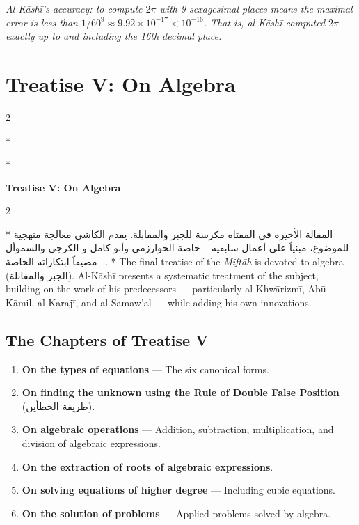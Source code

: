 \documentclass[11pt,a4paper]{article}
\newcommand{\cnote}[1]{\textcolor{notecolor}{\textit{#1}}}
\newcommand{\ar}[1]{{\arabicfont\beginR #1\endR}}
\newenvironment{bilingual}{%
  \vspace{0.3em}%
  \begin{paracol}{2}%
}{%
  \end{paracol}%
  \vspace{0.3em}%
}
\begin{document}
\cnote{Al-K\=ash\=i's accuracy: to compute $2\pi$ with 9 sexagesimal
places means the maximal error is less than $1/60^9 \approx 9.92 \times
10^{-17} < 10^{-16}$. That is, al-K\=ash\=i computed $2\pi$ exactly up to
and including the 16th decimal place.}
\clearpage

\section{Treatise V: On Algebra}
\label{sec:treatise5}

\begin{bilingual}
\switchcolumn[0]*
\begin{center}
\textbf{\Large\color{chapcolor}\ar{المقالة الخامسة في الجبر والمقابلة}}
\end{center}
\switchcolumn[1]*
\begin{center}
\textbf{\Large\color{chapcolor}Treatise V: On Algebra}
\end{center}
\end{bilingual}

\begin{bilingual}
\switchcolumn[0]*
\ar{المقالة الأخيرة في المفتاه مكرسة للجبر والمقابلة. يقدم الكاشي معالجة منهجية للموضوع، مبنياً على أعمال سابقيه -- خاصة الخوارزمي وأبو كامل و الكرجي والسموأل -- مضيفاً ابتكاراته الخاصة.}
\switchcolumn[1]*
The final treatise of the \textit{Mift\=ah} is devoted to algebra
(\ar{الجبر والمقابلة}). Al-K\=ash\=i presents a systematic treatment of
the subject, building on the work of his predecessors --- particularly
al-Khw\=arizm\=i, Ab\=u K\=amil, al-Karaj\=i, and al-Samaw'al --- while adding his
own innovations.
\end{bilingual}

\subsection{The Chapters of Treatise V}

\begin{enumerate}[label=\textbf{Ch.\arabic*:}]
  \item \textbf{On the types of equations} --- The six canonical forms.
  \item \textbf{On finding the unknown using the Rule of Double False
  Position} (\ar{طريقة الخطأين}).
  \item \textbf{On algebraic operations} --- Addition, subtraction,
  multiplication, and division of algebraic expressions.
  \item \textbf{On the extraction of roots of algebraic expressions}.
  \item \textbf{On solving equations of higher degree} --- Including
  cubic equations.
  \item \textbf{On the solution of problems} --- Applied problems solved
  by algebra.
\end{enumerate}
\end{document}
